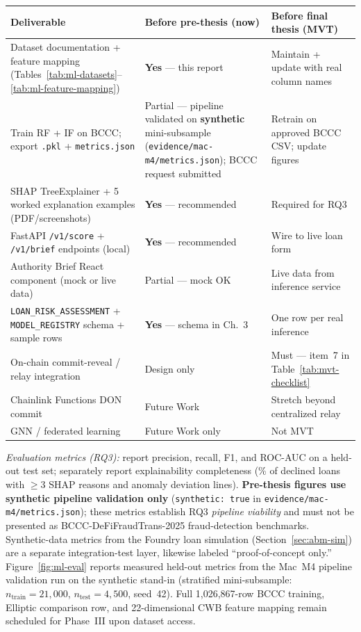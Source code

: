 \documentclass[12pt,a4paper]{report}
\newcommand{\tableheadcolor}{\rowcolor{TableHeadBg}}
\begin{document}
\begin{table}[H]
\centering
\begin{tabular}{p{5.2cm}p{3.8cm}p{4.2cm}}
\toprule
\tableheadcolor
\textbf{Deliverable} & \textbf{Before pre-thesis (now)} & \textbf{Before final thesis (MVT)} \\
\midrule
Dataset documentation + feature mapping (Tables~\ref{tab:ml-datasets}--\ref{tab:ml-feature-mapping}) & \textbf{Yes} --- this report & Maintain + update with real column names \\
Train RF + IF on BCCC; export \texttt{.pkl} + \texttt{metrics.json} & Partial --- pipeline validated on \textbf{synthetic} mini-subsample (\texttt{evidence/mac-m4/metrics.json}); BCCC request submitted & Retrain on approved BCCC CSV; update figures \\
SHAP TreeExplainer + 5 worked explanation examples (PDF/screenshots) & \textbf{Yes} --- recommended & Required for RQ3 \\
FastAPI \texttt{/v1/score} + \texttt{/v1/brief} endpoints (local) & \textbf{Yes} --- recommended & Wire to live loan form \\
Authority Brief React component (mock or live data) & Partial --- mock OK & Live data from inference service \\
\texttt{LOAN\_RISK\_ASSESSMENT} + \texttt{MODEL\_REGISTRY} schema + sample rows & \textbf{Yes} --- schema in Ch.~3 & One row per real inference \\
On-chain commit-reveal / relay integration & Design only & Must --- item~7 in Table~\ref{tab:mvt-checklist} \\
Chainlink Functions DON commit & Future Work & Stretch beyond centralized relay \\
GNN / federated learning & Future Work only & Not MVT \\
\bottomrule
\end{tabular}
\end{table}

\noindent\textit{Evaluation metrics (RQ3):} report precision, recall, F1, and ROC-AUC on a held-out test set; separately report explainability completeness (\% of declined loans with $\geq$3 SHAP reasons and anomaly deviation lines). \textbf{Pre-thesis figures use synthetic pipeline validation only} (\texttt{synthetic: true} in \texttt{evidence/mac-m4/metrics.json}); these metrics establish RQ3 \textit{pipeline viability} and must not be presented as BCCC-DeFiFraudTrans-2025 fraud-detection benchmarks. Synthetic-data metrics from the Foundry loan simulation (Section~\ref{sec:abm-sim}) are a separate integration-test layer, likewise labeled ``proof-of-concept only.'' Figure~\ref{fig:ml-eval} reports measured held-out metrics from the Mac~M4 pipeline validation run on the synthetic stand-in (stratified mini-subsample: $n_{\text{train}}{=}21{,}000$, $n_{\text{test}}{=}4{,}500$, seed~42). Full 1{,}026{,}867-row BCCC training, Elliptic comparison row, and 22-dimensional CWB feature mapping remain scheduled for Phase~III upon dataset access.
\end{document}
